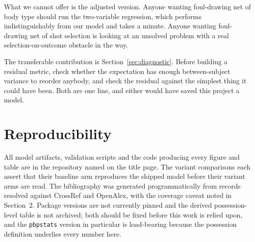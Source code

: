 \documentclass[11pt,letterpaper]{article}
\begin{document}
What we cannot offer is the adjusted version. Anyone wanting foul-drawing net of
body type should run the two-variable regression, which performs
indistinguishably from our model and takes a minute. Anyone wanting foul-drawing
net of shot selection is looking at an unsolved problem with a real
selection-on-outcome obstacle in the way.

The transferable contribution is Section~\ref{sec:diagnostic}. Before building a
residual metric, check whether the expectation has enough between-subject variance
to reorder anybody, and check the residual against the simplest thing it could
have been. Both are one line, and either would have saved this project a model.

\section*{Reproducibility}

All model artifacts, validation scripts and the code producing every figure and
table are in the repository named on the title page. The variant comparisons each
assert that their baseline arm reproduces the shipped model before their variant
arms are read. The bibliography was generated programmatically from records
resolved against CrossRef and OpenAlex, with the coverage caveat noted in
Section~2. Package versions are not currently pinned and the derived
possession-level table is not archived; both should be fixed before this work is
relied upon, and the \texttt{pbpstats} version in particular is load-bearing
because the possession definition underlies every number here.


\end{document}
